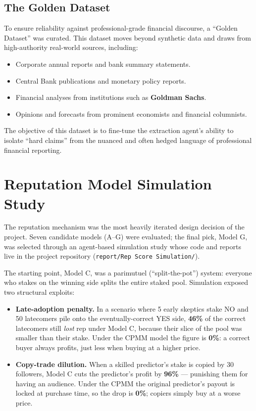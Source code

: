 \documentclass[a4paper,12pt]{report}
\begin{document}
\subsection{The Golden Dataset}

To ensure reliability against professional-grade financial discourse, a ``Golden Dataset'' was curated. This dataset moves beyond synthetic data and draws from high-authority real-world sources, including:
\begin{itemize}
    \item Corporate annual reports and bank summary statements.
    \item Central Bank publications and monetary policy reports.
    \item Financial analyses from institutions such as \textbf{Goldman Sachs}.
    \item Opinions and forecasts from prominent economists and financial columnists.
\end{itemize}
The objective of this dataset is to fine-tune the extraction agent's ability to isolate ``hard claims'' from the nuanced and often hedged language of professional financial reporting.

\section{Reputation Model Simulation Study}
\label{sec:rep_simulation}

The reputation mechanism was the most heavily iterated design decision of the project. Seven candidate models (A--G) were evaluated; the final pick, Model G, was selected through an agent-based simulation study whose code and reports live in the project repository (\texttt{report/Rep Score Simulation/}).

The starting point, Model C, was a parimutuel (``split-the-pot'') system: everyone who stakes on the winning side splits the entire staked pool. Simulation exposed two structural exploits:

\begin{itemize}
    \item \textbf{Late-adoption penalty.} In a scenario where 5 early skeptics stake NO and 50 latecomers pile onto the eventually-correct YES side, \textbf{46\%} of the correct latecomers still \emph{lost} rep under Model C, because their slice of the pool was smaller than their stake. Under the CPMM model the figure is \textbf{0\%}: a correct buyer always profits, just less when buying at a higher price.
    \item \textbf{Copy-trade dilution.} When a skilled predictor's stake is copied by 30 followers, Model C cuts the predictor's profit by \textbf{96\%} --- punishing them for having an audience. Under the CPMM the original predictor's payout is locked at purchase time, so the drop is \textbf{0\%}; copiers simply buy at a worse price.
\end{itemize}
\end{document}
